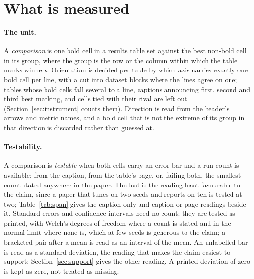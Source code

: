 \documentclass[sigconf,anonymous]{aamas}
\begin{document}
\section{What is measured}
\label{sec:what}

\paragraph{The unit.} A \emph{comparison} is one bold cell in a results table
set against the best non-bold cell in its group, where the group is the row or
the column within which the table marks winners. Orientation is decided per
table by which axis carries exactly one bold cell per line, with a cut into
dataset blocks where the lines agree on one; tables whose bold cells fall
several to a line, captions announcing first, second and third best marking,
and cells tied with their rival are left out (Section~\ref{sec:instrument}
counts them). Direction is read from the header's arrows and metric names,
and a bold cell that is not the extreme of its group in that direction is
discarded rather than guessed at.

\paragraph{Testability.} A comparison is \emph{testable} when both cells carry
an error bar and a run count is available: from the caption, from the table's
page, or, failing both, the smallest count stated anywhere in the paper.
The last is the reading least favourable to the claim, since a paper that
tunes on two seeds and reports on ten is tested at two; Table~\ref{tab:span}
gives the caption-only and caption-or-page readings beside it. Standard
errors and confidence intervals need no count: they are tested as
printed, with Welch's degrees of freedom where a count is stated and in
the normal limit where none is, which at few seeds is generous to the
claim; a bracketed pair after a mean is read as an interval of the mean.
An unlabelled bar is read as a standard deviation, the
reading that makes the claim easiest to support; Section~\ref{sec:support}
gives the other reading. A printed deviation of zero is kept as zero, not
treated as missing.
\end{document}
